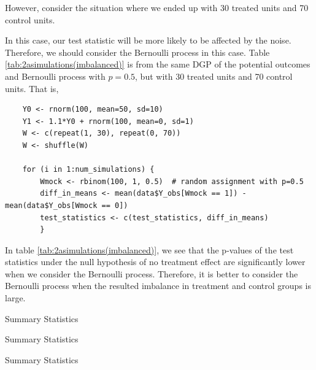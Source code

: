 \documentclass[11pt]{article}
\numberwithin{equation}{section}
\begin{document}
However, consider the situation where we ended up with 30 treated units and 70 control units.


In this case, our test statistic will be more likely to be affected by the noise.
Therefore, we should consider the Bernoulli process in this case.
Table \ref{tab:2asimulations(imbalanced)} is from the same DGP of the potential outcomes and Bernoulli process with $p=0.5$, but with 30 treated units and 70 control units.
That is, 

\begin{verbatim}
    Y0 <- rnorm(100, mean=50, sd=10)
    Y1 <- 1.1*Y0 + rnorm(100, mean=0, sd=1)
    W <- c(repeat(1, 30), repeat(0, 70))
    W <- shuffle(W)
    
    for (i in 1:num_simulations) {
        Wmock <- rbinom(100, 1, 0.5)  # random assignment with p=0.5
        diff_in_means <- mean(data$Y_obs[Wmock == 1]) -mean(data$Y_obs[Wmock == 0])
        test_statistics <- c(test_statistics, diff_in_means)
        }
    \end{verbatim}
    
    


In table \ref{tab:2asimulations(imbalanced)}, we see that the p-values of the test statistics under the null hypothesis of no treatment effect are significantly lower when we consider the Bernoulli process.
Therefore, it is better to consider the Bernoulli process when the resulted imbalance in treatment and control groups is large.


\appendix
\setcounter{figure}{0}                      
\setcounter{table}{0}                      
\renewcommand\thefigure{A.\arabic{figure}} 
\renewcommand\thetable{A.\arabic{table}} 

\begin{table}
    \centering
    \tiny
    
    \caption{\label{tab:summary_stats}Summary Statistics}
\end{table}


\begin{table}
    \centering
    \tiny
    
    \caption{\label{tab:summary_stats(control_group)}Summary Statistics}
\end{table}


\begin{table}
    \centering
    \tiny
    
    \caption{\label{tab:summary_stats(treated_group)}Summary Statistics}
\end{table}





\printbibliography
\end{document}
